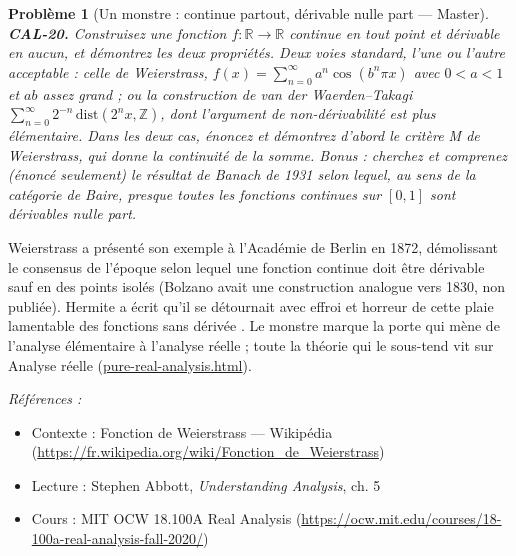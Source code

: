 \documentclass[11pt]{article}
\newtheorem{problem}{Problème}
\newenvironment{refs}{\par\small\noindent\emph{Références :}\begin{itemize}\setlength\itemsep{0pt}}{\end{itemize}\normalsize}
\begin{document}
\begin{problem}[{Un monstre : continue partout, dérivable nulle part --- Master}]
\textbf{CAL-20.} Construisez une fonction $ f:\mathbb{R}\to\mathbb{R} $
continue en tout point et dérivable en aucun, et démontrez les deux propriétés.
Deux voies standard, l'une ou l'autre acceptable : celle de Weierstrass,
$ f(x) = \sum_{n=0}^{\infty} a^n \cos(b^n \pi x) $ avec $ 0<a<1 $ et $ ab $
assez grand ; ou la construction de van der Waerden--Takagi
$ \sum_{n=0}^{\infty} 2^{-n}\,\mathrm{dist}(2^n x, \mathbb{Z}) $, dont l'argument de
non-dérivabilité est plus élémentaire. Dans les deux cas, énoncez et
démontrez d'abord le critère M de Weierstrass, qui donne la continuité de la somme. Bonus : cherchez et
comprenez (énoncé seulement) le résultat de Banach de 1931 selon lequel, au sens de la catégorie
de Baire, \textit{presque toutes} les fonctions continues sur $ [0,1] $ sont dérivables nulle part.
\end{problem}

\noindent Weierstrass a présenté son exemple à l'Académie de Berlin en 1872,
démolissant le consensus de l'époque selon lequel une fonction continue doit être dérivable
sauf en des points isolés (Bolzano avait une construction analogue vers 1830, non publiée).
Hermite a écrit qu'il se détournait \og{} avec effroi et horreur de cette plaie lamentable des
fonctions sans dérivée \fg{}. Le monstre marque la porte qui mène de l'analyse élémentaire à l'analyse
réelle ; toute la théorie qui le sous-tend vit sur
Analyse réelle (\url{pure-real-analysis.html}).

\begin{refs}
\item Contexte : Fonction de Weierstrass --- Wikipédia (\url{https://fr.wikipedia.org/wiki/Fonction_de_Weierstrass})
\item Lecture : Stephen Abbott, \textit{Understanding Analysis}, ch. 5
\item Cours : MIT OCW 18.100A Real Analysis (\url{https://ocw.mit.edu/courses/18-100a-real-analysis-fall-2020/})
\end{refs}

\bigskip
\end{document}

